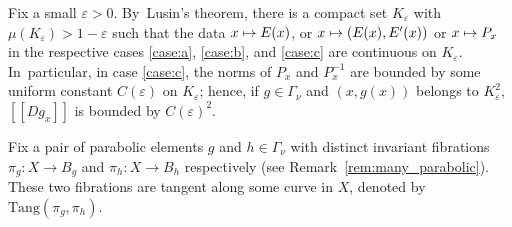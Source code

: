 \documentclass[11pt]{article}
\newcommand\mto{\mathchoice{\longmapsto}{\mapsto}{\mapsto}{\mapsto}}
\newcommand{\llbracket}{[\![}
\newcommand{\rrbracket}{]\!]}
\let\e\varepsilon
\newcommand{\Tang}{{\mathrm{Tang}}}
\theoremstyle{plain}
\theoremstyle{definition}
\numberwithin{equation}{section}
\begin{document}
Fix a small $\e>0$. By~Lusin's
theorem, there is a compact set $K_\e $ with $\mu(K_\e)>1-\e$
such that the data $x\mto E(x)$, or $x\mto (E(x), E'(x))$ or $x\mto P_x$ in the respective
cases \eqref{case:a}, \eqref{case:b}, and \eqref{case:c}
are continuous on $K_\e$. In~particular, in case \eqref{case:c}, the norms of $P_x$ and $P_x^{-1}$ are bounded by some uniform constant $C(\e)$
on $K_\e$; hence, if $g\in \Gamma_\nu$ and $(x,g(x))$ belongs to $K_\e^2$, $\llbracket Dg_x \rrbracket$ is bounded by $C(\e)^2$.

Fix a pair of parabolic elements $g$ and $h\in \Gamma_\nu$ with distinct invariant fibrations $\pi_g\colon X\to B_g$ and $\pi_h\colon X\to B_h$
respectively (see Remark~\ref{rem:many_parabolic}). These two fibrations are tangent along some curve in $X$, denoted by $\Tang(\pi_g, \pi_h)$.
\end{document}
